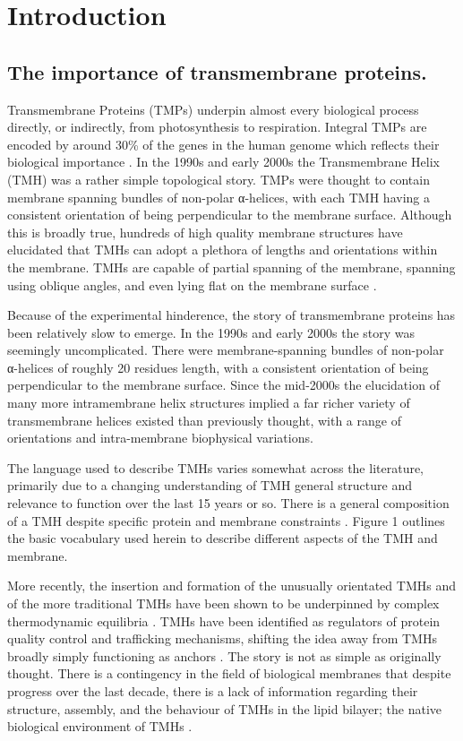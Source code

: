 \documentclass[12pt,PhD,twoside]{muthesis}
\begin{document}
\chapter{Introduction}
\section{The importance of transmembrane proteins.}
Transmembrane Proteins (TMPs) underpin almost every biological process directly, or indirectly, from photosynthesis to respiration. Integral TMPs are encoded by around 30\% of the genes in the human genome which reflects their biological importance \cite{Almen2009}. In the 1990s and early 2000s the Transmembrane Helix (TMH) was a rather simple topological story. TMPs were thought to contain membrane spanning bundles of non-polar α-helices, with each TMH having a consistent orientation of being perpendicular to the membrane surface. Although this is broadly true, hundreds of high quality membrane structures have elucidated that TMHs can adopt a plethora of lengths and orientations within the membrane. TMHs are capable of partial spanning of the membrane, spanning using oblique angles, and even lying flat on the membrane surface \cite{VonHeijne2006, Elofsson2007}.

Because of the experimental hinderence, the story of transmembrane proteins has been relatively slow to emerge. In the 1990s and early 2000s the story was seemingly uncomplicated. There were membrane-spanning bundles of non-polar α-helices of roughly 20 residues length, with a consistent orientation of being perpendicular to the membrane surface. Since the mid-2000s the elucidation of many more intramembrane helix structures implied a far richer variety of transmembrane helices existed than previously thought, with a range of orientations and intra-membrane biophysical variations.

The language used to describe TMHs varies somewhat across the literature, primarily due to a changing understanding of TMH general structure and relevance to function over the last 15 years or so. There is a general composition of a TMH despite specific protein and membrane constraints \cite{Sharpe2010}. Figure 1 outlines the basic vocabulary used herein to describe different aspects of the TMH and membrane.

More recently, the insertion and formation of the unusually orientated TMHs and of the more traditional TMHs have been shown to be underpinned by complex thermodynamic equilibria \cite{Cymer2014}. TMHs have been identified as regulators of protein quality control and trafficking mechanisms, shifting the idea away from TMHs broadly simply functioning as anchors \cite{Hessa2011}. The story is not as simple as originally thought. There is a contingency in the field of biological membranes that despite progress over the last decade, there is a lack of information regarding their structure, assembly, and the behaviour of TMHs in the lipid bilayer; the native biological environment of TMHs \cite{Ladokhin2015, Cymer2014}.
\end{document}
